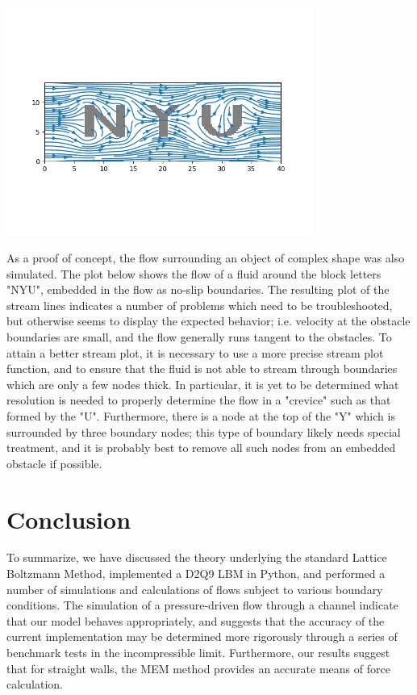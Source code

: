 \documentclass[a4paper]{article}
\begin{document}
\begin{center}
\includegraphics[width=10cm]{nyu.png}
\end{center}

As a proof of concept, the flow surrounding an object of complex shape was also simulated. The plot below shows the flow of a fluid around the block letters "NYU", embedded in the flow as no-slip boundaries. The resulting plot of the stream lines indicates a number of problems which need to be troubleshooted, but otherwise seems to display the expected behavior; i.e. velocity at the obstacle boundaries are small, and the flow generally runs tangent to the obstacles. To attain a better stream plot, it is necessary to use a more precise stream plot function, and to ensure that the fluid is not able to stream through boundaries which are only a few nodes thick. In particular, it is yet to be determined what resolution is needed to properly determine the flow in a "crevice" such as that formed by the "U". Furthermore, there is a node at the top of the "Y" which is surrounded by three boundary nodes; this type of boundary likely needs special treatment, and it is probably best to remove all such nodes from an embedded obstacle if possible. 

\section{Conclusion}
To summarize, we have discussed the theory underlying the standard Lattice Boltzmann Method, implemented a D2Q9 LBM in Python, and performed a number of simulations and calculations of flows subject to various boundary conditions. The simulation of a pressure-driven flow through a channel indicate that our model behaves appropriately, and suggests that the accuracy of the current implementation may be determined more rigorously through a series of benchmark tests in the incompressible limit. Furthermore, our results suggest that for straight walls, the MEM method provides an accurate means of force calculation. 
\end{document}
